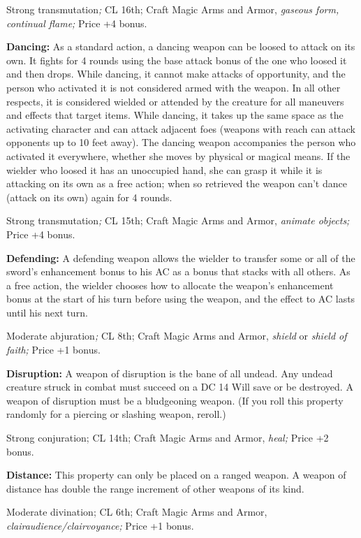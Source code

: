 \documentclass{article}
\begin{document}
Strong transmutation\textit{; }CL 16th; Craft Magic Arms and Armor, \textit{gaseous 
form, continual flame; }Price +4 bonus.

\textbf{Dancing: }As a standard action, a dancing weapon can be loosed to attack 
on its own. It fights for 4 rounds using the base attack bonus of the one who loosed 
it and then drops. While dancing, it cannot make attacks of opportunity, and the 
person who activated it is not considered armed with the weapon. In all other respects, 
it is considered wielded or attended by the creature for all maneuvers and effects 
that target items. While dancing, it takes up the same space as the activating 
character and can attack adjacent foes (weapons with reach can attack opponents 
up to 10 feet away). The dancing weapon accompanies the person who activated it 
everywhere, whether she moves by physical or magical means. If the wielder who 
loosed it has an unoccupied hand, she can grasp it while it is attacking on its 
own as a free action; when so retrieved the weapon can't dance (attack on its own) 
again for 4 rounds.

Strong transmutation\textit{; }CL 15th; Craft Magic Arms and Armor, \textit{animate 
objects; }Price +4 bonus.

\textbf{Defending:} A defending weapon allows the wielder to transfer some or all 
of the sword's enhancement bonus to his AC as a bonus that stacks with all others. 
As a free action, the wielder chooses how to allocate the weapon's enhancement 
bonus at the start of his turn before using the weapon, and the effect to AC lasts 
until his next turn.

Moderate abjuration\textit{; }CL 8th; Craft Magic Arms and Armor, \textit{shield 
}or \textit{shield of faith; }Price +1 bonus.

\textbf{Disruption:} A weapon of disruption is the bane of all undead. Any undead 
creature struck in combat must succeed on a DC 14 Will save or be destroyed. A 
weapon of disruption must be a bludgeoning weapon. (If you roll this property randomly 
for a piercing or slashing weapon, reroll.)

Strong conjuration; CL 14th; Craft Magic Arms and Armor, \textit{heal; }Price +2 
bonus.

\textbf{Distance: }This property can only be placed on a ranged weapon. A weapon 
of distance has double the range increment of other weapons of its kind.

Moderate divination; CL 6th; Craft Magic Arms and Armor, \textit{clairaudience/clairvoyance; 
}Price +1 bonus.
\end{document}
